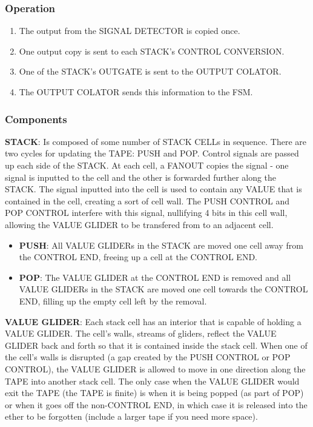 \documentclass{article}
\begin{document}
\subsubsection{Operation}\begin{enumerate}
\item The output from the SIGNAL DETECTOR is copied once.


\item One output copy is sent to each STACK's CONTROL CONVERSION.


\item One of the STACK's OUTGATE is sent to the OUTPUT COLATOR.


\item The OUTPUT COLATOR sends this information to the FSM.

\end{enumerate}\subsubsection{Components}
\noindent\textbf{STACK}: Is composed of some number of STACK CELLs in sequence. There are two cycles for updating the TAPE: PUSH and POP. Control signals are passed up each side of the STACK. At each cell, a FANOUT copies the signal - one signal is inputted to the cell and the other is forwarded further along the STACK. The signal inputted into the cell is used to contain any VALUE that is contained in the cell, creating a sort of cell wall. The PUSH CONTROL and POP CONTROL interfere with this signal, nullifying 4 bits in this cell wall, allowing the VALUE GLIDER to be transfered from to an adjacent cell.
\begin{itemize}
\item  \textbf{PUSH}: All VALUE GLIDERs in the STACK are moved one cell away from the CONTROL END, freeing up a cell at the CONTROL END.
   

\item  \textbf{POP}: The VALUE GLIDER at the CONTROL END is removed and all VALUE GLIDERs in the STACK are moved one cell towards the CONTROL END, filling up the empty cell left by the removal.
   
\end{itemize}
\vspace{1em}

\noindent\textbf{VALUE GLIDER}: Each stack cell has an interior that is capable of holding a VALUE GLIDER. The cell's walls, streams of gliders, reflect the VALUE GLIDER back and forth so that it is contained inside the stack cell. When one of the cell's walls is disrupted (a gap created by the PUSH CONTROL or POP CONTROL), the VALUE GLIDER is allowed to move in one direction along the TAPE into another stack cell. The only case when the VALUE GLIDER would exit the TAPE (the TAPE is finite) is when it is being popped (as part of POP) or when it goes off the non-CONTROL END, in which case it is released into the ether to be forgotten (include a larger tape if you need more space).
\end{document}
